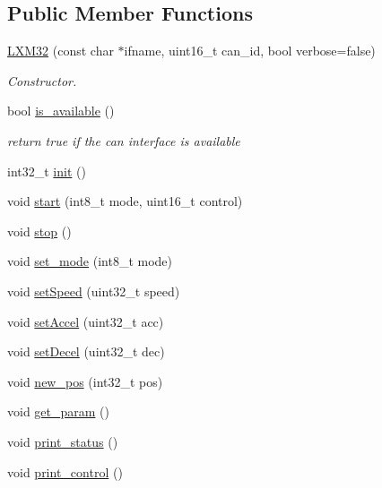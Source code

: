 \subsection*{Public Member Functions}
\begin{DoxyCompactItemize}
\item 
\hyperlink{class_l_x_m32_aa4a3e84b72c79b4d47e9f842a8977f98}{L\+X\+M32} (const char $\ast$ifname, uint16\+\_\+t can\+\_\+id, bool verbose=false)
\begin{DoxyCompactList}\small\item\em Constructor. \end{DoxyCompactList}\item 
bool \hyperlink{class_l_x_m32_a0a18e2b7e7d312156457c5a5b00def2e}{is\+\_\+available} ()
\begin{DoxyCompactList}\small\item\em return true if the can interface is available \end{DoxyCompactList}\item 
int32\+\_\+t \hyperlink{class_l_x_m32_a3cec01ae3a6afe61a31bfa37f7d1436d}{init} ()
\item 
void \hyperlink{class_l_x_m32_ae15a405ad09357b6dd0296db5bbce92d}{start} (int8\+\_\+t mode, uint16\+\_\+t control)
\item 
void \hyperlink{class_l_x_m32_a73364111a5c2be2d60b7456704f7b9a8}{stop} ()
\item 
void \hyperlink{class_l_x_m32_a4087402e009dd3be18765caac410d412}{set\+\_\+mode} (int8\+\_\+t mode)
\item 
void \hyperlink{class_l_x_m32_aefb41cdca05c78cf0df485df8abbaf69}{set\+Speed} (uint32\+\_\+t speed)
\item 
void \hyperlink{class_l_x_m32_ab942cd394ba87efa06704e9921395692}{set\+Accel} (uint32\+\_\+t acc)
\item 
void \hyperlink{class_l_x_m32_aa1b975678f618dd2383e61bef655a353}{set\+Decel} (uint32\+\_\+t dec)
\item 
void \hyperlink{class_l_x_m32_a3b470e3d484fc0fb2a208df10a8e29e7}{new\+\_\+pos} (int32\+\_\+t pos)
\item 
void \hyperlink{class_l_x_m32_aa36cd9154a11f3388715fa2f482c37ca}{get\+\_\+param} ()
\item 
void \hyperlink{class_l_x_m32_a201d8f9da28994a92612e2618b7a1167}{print\+\_\+status} ()
\item 
void \hyperlink{class_l_x_m32_a545b23fab3528a8039bb2cc62808f9f5}{print\+\_\+control} ()
\end{DoxyCompactItemize}
